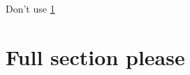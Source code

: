 \documentclass{article}
\begin{document}
Don't use \cref{sec:some.label}

\section{Full section please}\label{sec:some.label}
\end{document}
